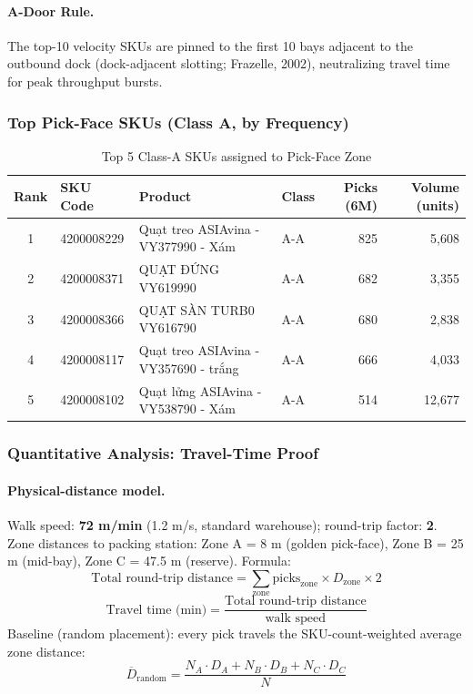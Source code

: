 \documentclass[11pt]{article}
\begin{document}
\paragraph{A-Door Rule.}
The top-10 velocity SKUs are pinned to the first 10 bays adjacent to the outbound dock (dock-adjacent slotting; Frazelle, 2002), neutralizing travel time for peak throughput bursts.

\subsubsection{Top Pick-Face SKUs (Class A, by Frequency)}\label{top-a}

\begin{table}[H]
\centering
\caption{Top 5 Class-A SKUs assigned to Pick-Face Zone}
\begin{tabular}{clllrr}
\toprule
Rank & SKU Code & Product & Class & Picks (6M) & Volume (units) \\
\midrule
        1 & 4200008229 & Quạt treo ASIAvina - VY377990 - Xám & A-A & 825 & 5,608 \\
        2 & 4200008371 & QUẠT ĐỨNG VY619990 & A-A & 682 & 3,355 \\
        3 & 4200008366 & QUẠT SÀN TURB0 VY616790 & A-A & 680 & 2,838 \\
        4 & 4200008117 & Quạt treo ASIAvina - VY357690 - trắng & A-A & 666 & 4,033 \\
        5 & 4200008102 & Quạt lửng ASIAvina - VY538790 - Xám & A-A & 514 & 12,677 \\
\bottomrule
\end{tabular}
\end{table}

\subsubsection{Quantitative Analysis: Travel-Time Proof}\label{travel-time}

\paragraph{Physical-distance model.}
Walk speed: \textbf{72 m/min} (1.2 m/s, standard warehouse); round-trip factor: \textbf{2}.
Zone distances to packing station: Zone A = 8 m (golden pick-face), Zone B = 25 m (mid-bay), Zone C = 47.5 m (reserve).
Formula:
$$\text{Total round-trip distance} = \sum_{\text{zone}} \text{picks}_{\text{zone}} \times D_{\text{zone}} \times 2$$
$$\text{Travel time (min)} = \frac{\text{Total round-trip distance}}{\text{walk speed}}$$
Baseline (random placement): every pick travels the SKU-count-weighted average zone distance:
$$\overline{D}_{\text{random}} = \frac{N_A \cdot D_A + N_B \cdot D_B + N_C \cdot D_C}{N}$$
\end{document}
